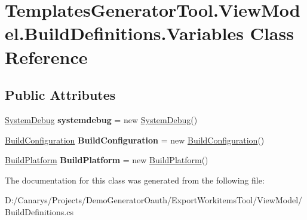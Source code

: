 \hypertarget{class_templates_generator_tool_1_1_view_model_1_1_build_definitions_1_1_variables}{}\section{Templates\+Generator\+Tool.\+View\+Model.\+Build\+Definitions.\+Variables Class Reference}
\label{class_templates_generator_tool_1_1_view_model_1_1_build_definitions_1_1_variables}
\subsection*{Public Attributes}
\begin{DoxyCompactItemize}
\item 
\mbox{\label{class_templates_generator_tool_1_1_view_model_1_1_build_definitions_1_1_variables_a3909d058fe171237f7de54d3c37a64e8}} 
\mbox{\hyperlink{class_templates_generator_tool_1_1_view_model_1_1_build_definitions_1_1_system_debug}{System\+Debug}} {\bfseries systemdebug} = new \mbox{\hyperlink{class_templates_generator_tool_1_1_view_model_1_1_build_definitions_1_1_system_debug}{System\+Debug}}()
\item 
\mbox{\label{class_templates_generator_tool_1_1_view_model_1_1_build_definitions_1_1_variables_a6ee30b6de008d69f0960b6f27a81fada}} 
\mbox{\hyperlink{class_templates_generator_tool_1_1_view_model_1_1_build_definitions_1_1_build_configuration}{Build\+Configuration}} {\bfseries Build\+Configuration} = new \mbox{\hyperlink{class_templates_generator_tool_1_1_view_model_1_1_build_definitions_1_1_build_configuration}{Build\+Configuration}}()
\item 
\mbox{\label{class_templates_generator_tool_1_1_view_model_1_1_build_definitions_1_1_variables_a09e06d867b8045fa1310bbb68183aadc}} 
\mbox{\hyperlink{class_templates_generator_tool_1_1_view_model_1_1_build_definitions_1_1_build_platform}{Build\+Platform}} {\bfseries Build\+Platform} = new \mbox{\hyperlink{class_templates_generator_tool_1_1_view_model_1_1_build_definitions_1_1_build_platform}{Build\+Platform}}()
\end{DoxyCompactItemize}


The documentation for this class was generated from the following file\+:\begin{DoxyCompactItemize}
\item 
D\+:/\+Canarys/\+Projects/\+Demo\+Generator\+Oauth/\+Export\+Workitems\+Tool/\+View\+Model/Build\+Definitions.\+cs\end{DoxyCompactItemize}
